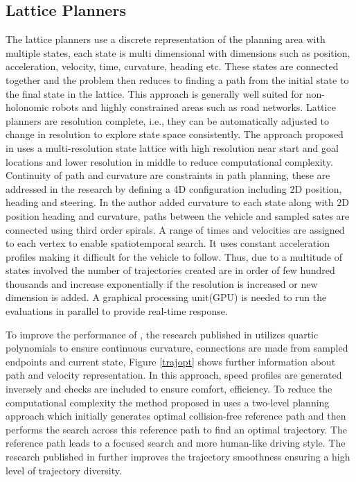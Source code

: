 \subsection{Lattice Planners}
\label{rw_lattice_planners}
The lattice planners use a discrete representation of the planning area with multiple states, each state is multi dimensional with dimensions such as position, acceleration, velocity, time, curvature, heading etc. These states are connected together and the problem then reduces to finding a path from the initial state to the final state in the lattice. This approach is generally well suited for non-holonomic robots and highly constrained areas such as road networks\cite{lattice_1}. Lattice planners are resolution complete, i.e., they can be automatically adjusted to change in resolution to explore state space consistently. The approach proposed in \cite{lattice_1} uses a multi-resolution state lattice with high resolution near start and goal locations and lower resolution in middle to reduce computational complexity. Continuity of path and curvature are constraints in path planning, these are addressed in the research \cite{lattice_2} by defining a 4D configuration including 2D position, heading and steering. In \cite{cmu_parallel_thesis} the author added curvature to each state along with 2D position heading and curvature, paths between the vehicle and sampled sates are connected using third order spirals. A range of times and velocities are assigned to each vertex to enable spatiotemporal search. It uses constant acceleration profiles making it difficult for the vehicle to follow. Thus, due to a multitude of states involved the number of trajectories created are in order of few hundred thousands and increase exponentially if the resolution is increased or new dimension is added. A graphical processing unit(GPU) is needed to run the evaluations in parallel to provide real-time response. 

To improve the performance of \cite{cmu_parallel_thesis}, the research published in \cite{traj_planner_optimization} utilizes quartic polynomials to ensure continuous curvature, connections are made from sampled endpoints and current state, Figure \ref{trajopt} shows further information about path and velocity representation. In this approach, speed profiles are generated inversely and checks are included to ensure comfort, efficiency. To reduce the computational complexity the method proposed in \cite{traj_smoothing} uses a two-level planning approach which initially generates optimal collision-free reference path and then performs the search across this reference path to find an optimal trajectory. The reference path leads to a focused search and more human-like driving style. The research published in \cite{diss_shui_phd_thesis} further improves the trajectory smoothness ensuring a high level of trajectory diversity.

